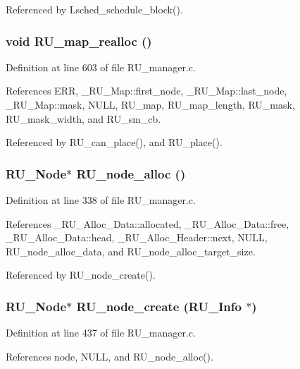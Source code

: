 Referenced by Lsched\_\-schedule\_\-block().
\subsubsection{\setlength{\rightskip}{0pt plus 5cm}void RU\_\-map\_\-realloc ()}\label{RU__manager_8h_8d236d81b60c9e8059d44b25b79f0d7b}




Definition at line 603 of file RU\_\-manager.c.

References ERR, \_\-RU\_\-Map::first\_\-node, \_\-RU\_\-Map::last\_\-node, \_\-RU\_\-Map::mask, NULL, RU\_\-map, RU\_\-map\_\-length, RU\_\-mask, RU\_\-mask\_\-width, and RU\_\-sm\_\-cb.

Referenced by RU\_\-can\_\-place(), and RU\_\-place().
\subsubsection{\setlength{\rightskip}{0pt plus 5cm}\bf{RU\_\-Node}$\ast$ RU\_\-node\_\-alloc ()}\label{RU__manager_8h_a889b1b89b178b55414274fe9e308863}




Definition at line 338 of file RU\_\-manager.c.

References \_\-RU\_\-Alloc\_\-Data::allocated, \_\-RU\_\-Alloc\_\-Data::free, \_\-RU\_\-Alloc\_\-Data::head, \_\-RU\_\-Alloc\_\-Header::next, NULL, RU\_\-node\_\-alloc\_\-data, and RU\_\-node\_\-alloc\_\-target\_\-size.

Referenced by RU\_\-node\_\-create().
\subsubsection{\setlength{\rightskip}{0pt plus 5cm}\bf{RU\_\-Node}$\ast$ RU\_\-node\_\-create (\bf{RU\_\-Info} $\ast$)}\label{RU__manager_8h_62603687ae727a2092479d0611311730}




Definition at line 437 of file RU\_\-manager.c.

References node, NULL, and RU\_\-node\_\-alloc().

